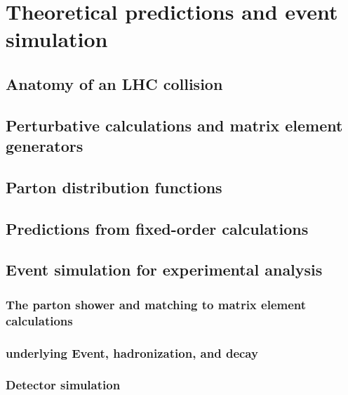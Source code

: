 \chapter{Theoretical predictions and event simulation}
\label{sec:simulation}
\section{Anatomy of an LHC collision}
\section{Perturbative calculations and matrix element generators}
\section{Parton distribution functions}
\section{Predictions from fixed-order calculations}
\section{Event simulation for experimental analysis}
  \subsection{The parton shower and matching to matrix element calculations}
  \subsection{underlying Event, hadronization, and decay}
  \subsection{Detector simulation}

